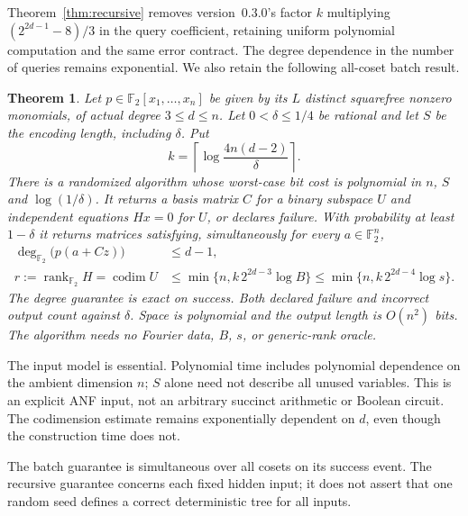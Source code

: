\documentclass[11pt]{article}
\newtheorem{theorem}{Theorem}
\theoremstyle{remark}\newtheorem{remark}[theorem]{Remark}
\newcommand{\F}{\mathbb F}
\newcommand{\rank}{\operatorname{rank}}
\newcommand{\codim}{\operatorname{codim}}
\begin{document}
Theorem~\ref{thm:recursive} removes version~0.3.0's factor $k$ multiplying $(2^{2d-1}-8)/3$ in the query coefficient, retaining uniform polynomial computation and the same error contract. The degree dependence in the number of queries remains exponential. We also retain the following all-coset batch result.

\begin{theorem}\label{thm:main}
Let $p\in\F_2[x_1,\ldots,x_n]$ be given by its $L$ distinct squarefree nonzero monomials, of actual degree $3\le d\le n$. Let $0<\delta\le1/4$ be rational and let $S$ be the encoding length, including $\delta$. Put
\[
 k=\left\lceil\log\frac{4n(d-2)}{\delta}\right\rceil .
\]
There is a randomized algorithm whose worst-case bit cost is polynomial in $n$, $S$ and $\log(1/\delta)$. It returns a basis matrix $C$ for a binary subspace $U$ and independent equations $Hx=0$ for $U$, or declares failure. With probability at least $1-\delta$ it returns matrices satisfying, simultaneously for every $a\in\F_2^n$,
\begin{align}
 \deg_{\F_2}\bigl(p(a+Cz)\bigr)&\le d-1,\label{eq:drop}\\
 r:=\rank_{\F_2}H=\codim U
 &\le \min\{n,k\,2^{2d-3}\log B\}
 \le \min\{n,k\,2^{2d-4}\log s\}.\label{eq:cost}
\end{align}
The degree guarantee is exact on success. Both declared failure and incorrect output count against $\delta$. Space is polynomial and the output length is $O(n^2)$ bits. The algorithm needs no Fourier data, $B$, $s$, or generic-rank oracle.
\end{theorem}

The input model is essential. Polynomial time includes polynomial dependence on the ambient dimension $n$; $S$ alone need not describe all unused variables. This is an explicit ANF input, not an arbitrary succinct arithmetic or Boolean circuit. The codimension estimate remains exponentially dependent on $d$, even though the construction time does not.

The batch guarantee is simultaneous over all cosets on its success event. The recursive guarantee concerns each fixed hidden input; it does not assert that one random seed defines a correct deterministic tree for all inputs.
\end{document}
